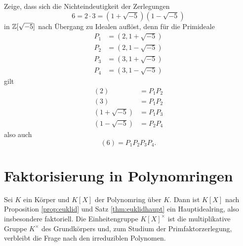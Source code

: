\documentclass{book}
\begin{document}
\begin{prob}
    \label{prob:6}
    Zeige, dass sich die Nichteindeutigkeit der Zerlegungen
    \[
        6 = 2 \cdot 3 = (1   + \sqrt{-5})(1 - \sqrt{-5})
    \] 
    in $\mathbb{Z}[\sqrt{-5}]$ nach Übergang zu Idealen auflöst, denn für die Primideale
    \begin{align*}
        P_1 & = (2, 1 + \sqrt{-5})\\
        P_2 & = (2, 1 - \sqrt{-5})\\
        P_3 & = (3, 1 + \sqrt{-5})\\
        P_4 & = (3, 1 - \sqrt{-5})
    \end{align*}
    gilt
    \begin{align*}
        (2) & = P_1 P_2\\
        (3) & = P_1 P_2\\
        (1 + \sqrt{-5}) & = P_1 P_3\\
        (1 - \sqrt{-5}) & = P_2 P_4
    \end{align*}
    also auch
    \[
        (6) = P_1 P_2 P_3 P_4.
    \]
\end{prob}

\section{Faktorisierung in Polynomringen}%
\label{sec:polynomringe}

Sei $K$ ein Körper und $K[X]$ der Polynomring über $K$. Dann ist $K[X]$ nach
Proposition \ref{prop:euklid} und Satz \ref{thm:euklidhaupt} ein
Hauptidealring, also insbesondere faktoriell. Die Einheitengruppe
$K[X]^{\times}$ ist die multiplikative Gruppe $K^{\times}$ des Grundkörpers
und, zum Studium der Primfaktorzerlegung, verbleibt die Frage nach den
irreduziblen Polynomen. 
\end{document}
